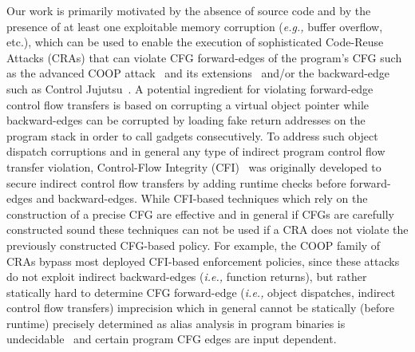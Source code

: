 Our work is primarily motivated by the absence of source code and by the presence of at least one exploitable
memory corruption (\textit{e.g.,} buffer overflow, etc.), which can be used to enable the execution of sophisticated Code-Reuse Attacks 
(CRAs) that can violate CFG forward-edges 
of the program's CFG such as the advanced COOP attack~\cite{schuster:coop} and its 
extensions~\cite{crane:readactor++, subversive-c:lettner, ctf:coop, loop:oriented} and/or the backward-edge such as Control Jujutsu~\cite{jujutsu}. 
A potential ingredient for violating forward-edge control flow transfers is based on corrupting a virtual object pointer 
while backward-edges can be corrupted by loading fake return addresses on the program stack in order to call gadgets consecutively.
To address such object dispatch corruptions
and in general any type of indirect program control flow transfer violation, Control-Flow Integrity (CFI)~\cite{abadi:cfi2, abadi:cfi} 
was originally developed to secure indirect control flow transfers by adding runtime checks before forward-edges and backward-edges. 
While CFI-based techniques which rely on the construction of a precise CFG are effective \cite{cfi:survey} and in general if CFGs are carefully constructed
sound \cite{cfg:sound} these techniques can not be used if a CRA does not violate the previously constructed CFG-based policy.
For example, the COOP family of CRAs bypass most deployed CFI-based enforcement policies, since 
these attacks do not exploit indirect backward-edges (\textit{i.e.,} function returns), but rather statically hard to determine CFG
forward-edge (\textit{i.e.,} object dispatches, indirect control flow transfers) imprecision which in general cannot be statically (before runtime) precisely determined 
as alias analysis in program binaries is undecidable~\cite{alias:undecidable} and certain program CFG edges are input dependent.

